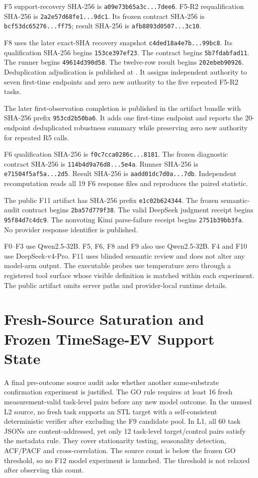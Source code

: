 F5 support-recovery SHA-256 is \texttt{a09e73b65a3c...7dee6}. F5-R2 requalification SHA-256 is \texttt{2a2e57d68fe1...9dc1}. Its frozen contract SHA-256 is \texttt{bcf53dc65276...ff75}; result SHA-256 is \texttt{afb8893d0507...3c10}.

F8 uses the later exact-SHA recovery snapshot \texttt{c4ded18a4e7b...99bc8}. Its qualification SHA-256 begins \texttt{153ce397ef23}. The contract begins \texttt{5b7fdabfad11}. The runner begins \texttt{49614d390d58}. The twelve-row result begins \texttt{202ebeb90926}. Deduplication adjudication is published at . It assigns independent authority to seven first-time endpoints and zero new authority to the five repeated F5-R2 tasks.

The later first-observation completion is published in the artifact bundle with SHA-256 prefix \texttt{953cd2b50ba6}. It adds one first-time endpoint and reports the 20-endpoint deduplicated robustness summary while preserving zero new authority for repeated R5 calls.

F6 qualification SHA-256 is \texttt{f0c7cca0286c...8181}. The frozen diagnostic contract SHA-256 is \texttt{114b4d9a76d8...5e4a}. Runner SHA-256 is \texttt{e71504f5af5a...2d5}. Result SHA-256 is \texttt{aadd01dc7d0a...7db}. Independent recomputation reads all 19 F6 response files and reproduces the paired statistic.

The public F11 artifact has SHA-256 prefix \texttt{e1c02b624344}. The frozen semantic-audit contract begins \texttt{2ba57d779f38}. The valid DeepSeek judgment receipt begins \texttt{95f84d7c4dc9}. The nonvoting Kimi parse-failure receipt begins \texttt{2751b39bb3fa}. No provider response identifier is published.

F0--F3 use Qwen2.5-32B. F5, F6, F8 and F9 also use Qwen2.5-32B. F4 and F10 use DeepSeek-v4-Pro. F11 uses blinded semantic review and does not alter any model-arm output. The executable probes use temperature zero through a registered tool surface whose visible definition is matched within each experiment. The public artifact omits server paths and provider-local runtime details.

\section{Fresh-Source Saturation and Frozen TimeSage-EV Support State}
A final pre-outcome source audit asks whether another same-substrate confirmation experiment is justified. The GO rule requires at least 16 fresh measurement-valid task-level pairs before any new model outcome. In the unused L2 source, no fresh task supports an STL target with a self-consistent deterministic verifier after excluding the F9 candidate pool. In L1, all 60 task JSONs are content-addressed, yet only 12 task-level target/control pairs satisfy the metadata rule. They cover stationarity testing, seasonality detection, ACF/PACF and cross-correlation. The source count is below the frozen GO threshold, so no F12 model experiment is launched. The threshold is not relaxed after observing this count.

